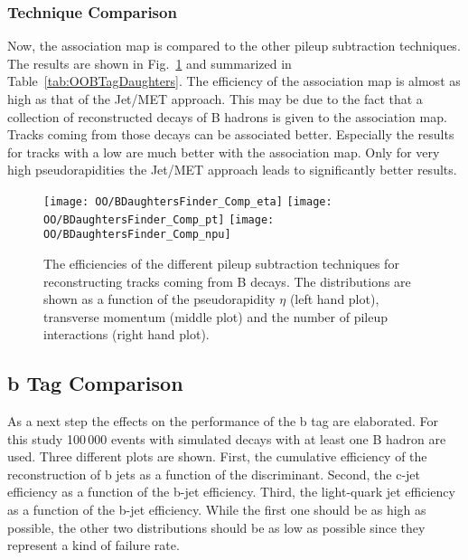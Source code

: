

\subsubsection{Technique Comparison \label{sec:OOBTagDaughtersComp}}

Now, the association map is compared to the other pileup subtraction techniques. The results are shown in Fig.~\ref{plot:OOBTagDaughtersComp} and summarized in Table~\ref{tab:OOBTagDaughters}. The efficiency of the association map is almost as high as that of the Jet/MET approach. This may be due to the fact that a collection of reconstructed decays of B hadrons is given to the association map. Tracks coming from those decays can be associated better. Especially the results for tracks with a low \pt are much better with the association map. Only for very high pseudorapidities the Jet/MET approach leads to significantly better results. 

\begin{figure}[h!t]
  \centering
  \texttt{[image: OO/BDaughtersFinder\_Comp\_eta]}
  \texttt{[image: OO/BDaughtersFinder\_Comp\_pt]}
  \texttt{[image: OO/BDaughtersFinder\_Comp\_npu]}
  \caption[Efficiencies of the different pileup subtraction techniques for reconstructing tracks from B decays]{The efficiencies of the different pileup subtraction techniques for reconstructing tracks coming from B decays. The distributions are shown as a function of the pseudorapidity $\eta$ (left hand plot), transverse momentum (middle plot) and the number of pileup interactions (right hand plot). \label{plot:OOBTagDaughtersComp}}
\end{figure}

\subsection{b Tag Comparison}

As a next step the effects on the performance of the b tag are elaborated. For this study 100\,000 events with simulated \ttbar decays with at least one B hadron are used. Three different plots are shown. First, the cumulative efficiency of the reconstruction of b jets as a function of the discriminant. Second, the c-jet efficiency as a function of the b-jet efficiency. Third, the light-quark jet efficiency as a function of the b-jet efficiency. While the first one should be as high as possible, the other two distributions should be as low as possible since they represent a kind of failure rate. 

